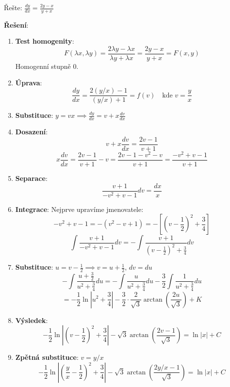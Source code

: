 \begin{example}
Řešte: $\frac{dy}{dx} = \frac{2y - x}{y + x}$
\vspace{0.3\baselineskip}

\textbf{Řešení}: 
\begin{enumerate}
\item \textbf{Test homogenity}:
\[
F(\lambda x, \lambda y) = \frac{2\lambda y - \lambda x}{\lambda y + \lambda x} = \frac{2y - x}{y + x} = F(x, y)
\]
Homogenní stupně 0.

\item \textbf{Úprava}:
\[
\frac{dy}{dx} = \frac{2(y/x) - 1}{(y/x) + 1} = f(v) \quad \text{kde } v = \frac{y}{x}
\]

\item \textbf{Substituce}: $y = vx \implies \frac{dy}{dx} = v + x\frac{dv}{dx}$

\item \textbf{Dosazení}:
\[
v + x\frac{dv}{dx} = \frac{2v - 1}{v + 1}
\]
\[
x\frac{dv}{dx} = \frac{2v - 1}{v + 1} - v = \frac{2v - 1 - v^2 - v}{v + 1} = \frac{-v^2 + v - 1}{v + 1}
\]

\item \textbf{Separace}:
\[
\frac{v + 1}{-v^2 + v - 1}dv = \frac{dx}{x}
\]

\item \textbf{Integrace}: Nejprve upravíme jmenovatele:
\[
-v^2 + v - 1 = -(v^2 - v + 1) = -\left[(v - \frac{1}{2})^2 + \frac{3}{4}\right]
\]
\[
\int \frac{v + 1}{-v^2 + v - 1}dv = -\int \frac{v + 1}{(v - \frac{1}{2})^2 + \frac{3}{4}}dv
\]

\item \textbf{Substituce}: $u = v - \frac{1}{2} \implies v = u + \frac{1}{2}$, $dv = du$
\[
-\int \frac{u + \frac{3}{2}}{u^2 + \frac{3}{4}}du = -\int \frac{u}{u^2 + \frac{3}{4}}du - \frac{3}{2}\int \frac{1}{u^2 + \frac{3}{4}}du
\]
\[
= -\frac{1}{2}\ln|u^2 + \frac{3}{4}| - \frac{3}{2} \cdot \frac{2}{\sqrt{3}}\arctan\left(\frac{2u}{\sqrt{3}}\right) + K
\]

\item \textbf{Výsledek}:
\[
-\frac{1}{2}\ln\left|\left(v - \frac{1}{2}\right)^2 + \frac{3}{4}\right| - \sqrt{3}\arctan\left(\frac{2v - 1}{\sqrt{3}}\right) = \ln|x| + C
\]

\item \textbf{Zpětná substituce}: $v = y/x$
\[
-\frac{1}{2}\ln\left|\left(\frac{y}{x} - \frac{1}{2}\right)^2 + \frac{3}{4}\right| - \sqrt{3}\arctan\left(\frac{2y/x - 1}{\sqrt{3}}\right) = \ln|x| + C
\]
\end{enumerate}
\end{example}


